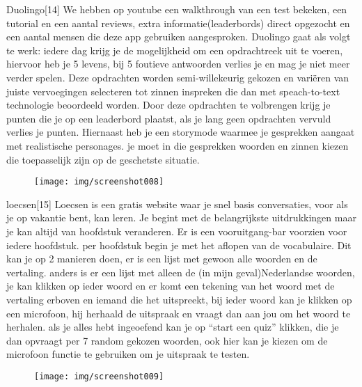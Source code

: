 \documentclass{hogent-article}
\begin{document}
Duolingo[14]
We hebben op youtube een walkthrough van een test bekeken, een tutorial en een aantal reviews, extra informatie(leaderbords) direct opgezocht en een aantal mensen die deze app gebruiken aangesproken. Duolingo gaat als volgt te werk: iedere dag krijg je de mogelijkheid om een opdrachtreek uit te voeren, hiervoor heb je 5 levens, bij 5 foutieve antwoorden verlies je en mag je niet meer verder spelen. Deze opdrachten worden semi-willekeurig gekozen en variëren van juiste vervoegingen selecteren tot  zinnen inspreken die dan met speach-to-text technologie beoordeeld worden. Door deze opdrachten te volbrengen krijg je punten die je op een leaderbord plaatst, als je  lang geen opdrachten vervuld verlies je punten. Hiernaast heb je een storymode waarmee je gesprekken aangaat met realistische personages. je moet in die gesprekken woorden en zinnen kiezen die toepasselijk zijn op de geschetste situatie.

\begin{figure}
    \centering
    \texttt{[image: img/screenshot008]}
    \caption{}
    \label{fig:screenshot008}
\end{figure}

loecsen[15]
Loecsen is een gratis website waar je snel basis conversaties, voor als je op vakantie bent, kan leren. Je begint met de belangrijkste uitdrukkingen maar je kan altijd van hoofdstuk veranderen. Er is een vooruitgang-bar voorzien voor iedere hoofdstuk. per hoofdstuk begin je met het aflopen van de vocabulaire. Dit kan je op 2 manieren doen, er is een lijst met gewoon alle woorden en de vertaling. anders is er een lijst met alleen de (in mijn geval)Nederlandse woorden, je kan klikken op ieder woord en er komt een tekening van het woord met de vertaling erboven en iemand die het uitspreekt, bij ieder woord kan je klikken op een microfoon, hij herhaald de uitspraak en vraagt dan aan jou om het woord te herhalen. als je alles hebt ingeoefend kan je op “start een quiz” klikken, die je dan opvraagt per 7 random gekozen woorden, ook hier kan je kiezen om de microfoon functie te gebruiken om je uitspraak te testen.

\begin{figure}
    \centering
    \texttt{[image: img/screenshot009]}
    \caption{}
    \label{fig:screenshot009}
\end{figure}
\end{document}
